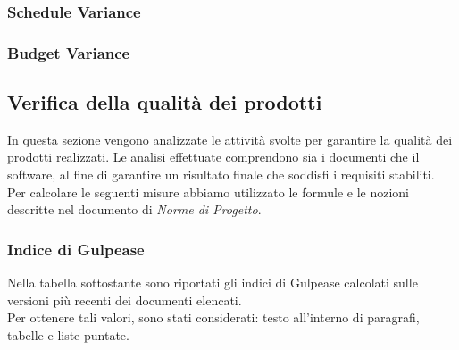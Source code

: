 \subsubsection{Schedule Variance}

\subsubsection{Budget Variance}

\subsection{Verifica della qualità dei prodotti}
In questa sezione vengono analizzate le attività svolte per garantire la qualità dei prodotti realizzati. Le analisi effettuate comprendono sia i documenti che il software, al fine di garantire un risultato finale che soddisfi i requisiti stabiliti.\\
Per calcolare le seguenti misure abbiamo utilizzato le formule e le nozioni descritte nel documento di \textit{Norme di Progetto}.

\subsubsection{Indice di Gulpease}
Nella tabella sottostante sono riportati gli indici di Gulpease calcolati sulle versioni più recenti dei documenti elencati.\\
Per ottenere tali valori, sono stati considerati: testo all'interno di paragrafi, tabelle e liste puntate.




